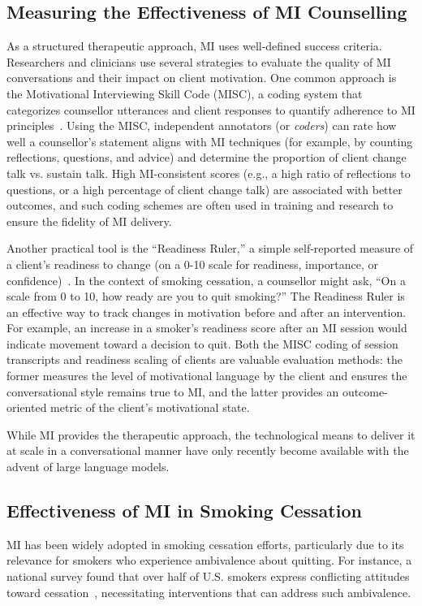 \subsection*{Measuring the Effectiveness of MI Counselling}
As a structured therapeutic approach, MI uses well-defined success criteria. Researchers and clinicians use several strategies to evaluate the quality of MI conversations and their impact on client motivation. One common approach is the Motivational Interviewing Skill Code (MISC), a coding system that categorizes counsellor utterances and client responses to quantify adherence to MI principles~\cite{Houck2010}. Using the MISC, independent annotators (or \emph{coders}) can rate how well a counsellor's statement aligns with MI techniques (for example, by counting reflections, questions, and advice) and determine the proportion of client change talk vs. sustain talk. High MI-consistent scores (e.g., a high ratio of reflections to questions, or a high percentage of client change talk) are associated with better outcomes, and such coding schemes are often used in training and research to ensure the fidelity of MI delivery.

Another practical tool is the ``Readiness Ruler,'' a simple self-reported measure of a client's readiness to change (on a 0-10 scale for readiness, importance, or confidence)~\cite{Boudreaux2012}. In the context of smoking cessation, a counsellor might ask, ``On a scale from 0 to 10, how ready are you to quit smoking?'' The Readiness Ruler is an effective way to track changes in motivation before and after an intervention. For example, an increase in a smoker's readiness score after an MI session would indicate movement toward a decision to quit. Both the MISC coding of session transcripts and readiness scaling of clients are valuable evaluation methods: the former measures the level of motivational language by the client and ensures the conversational style remains true to MI, and the latter provides an outcome-oriented metric of the client's motivational state.

While MI provides the therapeutic approach, the technological means to deliver it at scale in a conversational manner have only recently become available with the advent of large language models.

\subsection{Effectiveness of MI in Smoking Cessation}
MI has been widely adopted in smoking cessation efforts, particularly due to its relevance for smokers who experience ambivalence about quitting. For instance, a national survey found that over half of U.S. smokers express conflicting attitudes toward cessation~\cite{Babb2017}, necessitating interventions that can address such ambivalence.

